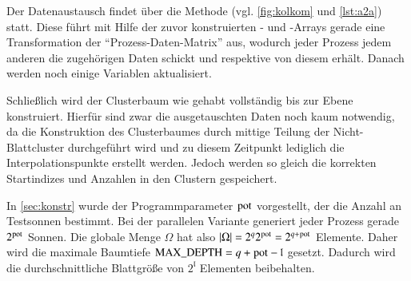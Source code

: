     Der Datenaustausch findet über die Methode  (vgl. \autoref{fig:kolkom} und \autoref{lst:a2a}) statt. Diese führt mit Hilfe der zuvor konstruierten - und 
    -Arrays gerade eine Transformation der ``Prozess-Daten-Matrix'' aus, wodurch jeder Prozess jedem anderen die zugehörigen Daten schickt und respektive von diesem erhält.
    Danach werden noch einige Variablen aktualisiert. 
    
    Schließlich wird der Clusterbaum wie gehabt vollständig bis zur Ebene  konstruiert. Hierfür sind zwar die ausgetauschten Daten noch kaum notwendig, da die Konstruktion des 
    Clusterbaumes durch mittige Teilung der Nicht-Blattcluster durchgeführt wird und zu diesem Zeitpunkt lediglich die Interpolationspunkte erstellt werden. Jedoch werden so gleich die korrekten
    Startindizes und Anzahlen in den Clustern gespeichert.
    
    In \autoref{sec:konstr} wurde der Programmparameter $\tcode{pot}$ vorgestellt, der die Anzahl an Testsonnen bestimmt. Bei der parallelen Variante generiert jeder Prozess gerade $2^{\tcode{pot}}$
    Sonnen. Die globale Menge $\Omega$ hat also $|\Omega| = 2^q 2^\tcode{pot} = 2^{q+\tcode{pot}}$ Elemente. Daher wird die maximale Baumtiefe $\tcode{MAX_DEPTH} = q + \tcode{pot} - \mathfrak{l}$ 
    gesetzt. Dadurch wird die durchschnittliche Blattgröße von $2^\mathfrak{l}$ Elementen beibehalten.
    
